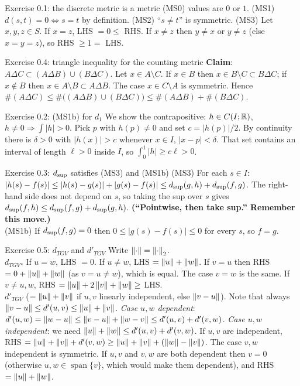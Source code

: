 \begin{example}{Exercise 0.1: the discrete metric is a metric}
(MS0) values are $0$ or $1$. (MS1) $d(s,t)=0\iff s=t$ by definition. (MS2) ``$s\ne t$'' is
symmetric. (MS3) Let $x,y,z\in S$. If $x=z$, LHS $=0\le$ RHS. If $x\ne z$ then $y\ne x$ or
$y\ne z$ (else $x=y=z$), so RHS $\ge1=$ LHS.
\end{example}

\begin{example}{Exercise 0.4: triangle inequality for the counting metric}
\textbf{Claim}: $A\Delta C\subset(A\Delta B)\cup(B\Delta C)$. Let $x\in A\setminus C$. If
$x\in B$ then $x\in B\setminus C\subset B\Delta C$; if $x\notin B$ then $x\in A\setminus B\subset
A\Delta B$. The case $x\in C\setminus A$ is symmetric. Hence
$\#(A\Delta C)\le\#\big((A\Delta B)\cup(B\Delta C)\big)\le\#(A\Delta B)+\#(B\Delta C)$.
\end{example}

\begin{example}{Exercise 0.2: (MS1b) for $d_1$}
We show the contrapositive: $h\in C(I;\mathbb R)$, $h\ne0\Rightarrow\int|h|>0$. Pick $p$ with
$h(p)\ne0$ and set $c=|h(p)|/2$. By continuity there is $\delta>0$ with $|h(x)|>c$ whenever
$x\in I$, $|x-p|<\delta$. That set contains an interval of length $\ell>0$ inside $I$, so
$\int_0^1|h|\ge c\ell>0$.
\end{example}

\begin{example}{Exercise 0.3: $d_{\sup}$ satisfies (MS3) and (MS1b)}
(MS3) For each $s\in I$: $|h(s)-f(s)|\le|h(s)-g(s)|+|g(s)-f(s)|\le d_{\sup}(g,h)+d_{\sup}(f,g)$.
The right-hand side does not depend on $s$, so taking the sup over $s$ gives
$d_{\sup}(f,h)\le d_{\sup}(f,g)+d_{\sup}(g,h)$. \textbf{(``Pointwise, then take sup.'' Remember this
move.)}\\
(MS1b) If $d_{\sup}(f,g)=0$ then $0\le|g(s)-f(s)|\le0$ for every $s$, so $f=g$.
\end{example}

\begin{example}{Exercise 0.5: $d_{TGV}$ and $d'_{TGV}$}
Write $\left\lVert\cdot\right\rVert=\left\lVert\cdot\right\rVert_2$.\\
\textbf{$d_{TGV}$.} If $u=w$, LHS $=0$. If $u\ne w$, LHS $=\left\lVert u\right\rVert+\left\lVert w\right\rVert$. If $v=u$ then RHS
$=0+\left\lVert u\right\rVert+\left\lVert w\right\rVert$ (as $v=u\ne w$), which is equal. The case $v=w$ is the same. If $v\ne u,w$,
RHS $=\left\lVert u\right\rVert+2\left\lVert v\right\rVert+\left\lVert w\right\rVert\ge$ LHS.\\
\textbf{$d'_{TGV}$} ($=\left\lVert u\right\rVert+\left\lVert v\right\rVert$ if $u,v$ linearly independent, else $\left\lVert v-u\right\rVert$).
Note that always $\left\lVert v-u\right\rVert\le d'(u,v)\le\left\lVert u\right\rVert+\left\lVert v\right\rVert$.
\emph{Case $u,w$ dependent}: $d'(u,w)=\left\lVert w-u\right\rVert\le\left\lVert v-u\right\rVert+\left\lVert w-v\right\rVert\le d'(u,v)+d'(v,w)$.
\emph{Case $u,w$ independent}: we need $\left\lVert u\right\rVert+\left\lVert w\right\rVert\le d'(u,v)+d'(v,w)$.
If $u,v$ are independent, RHS $=\left\lVert u\right\rVert+\left\lVert v\right\rVert+d'(v,w)\ge\left\lVert u\right\rVert+\left\lVert v\right\rVert+(\left\lVert w\right\rVert-\left\lVert v\right\rVert)$.
The case $v,w$ independent is symmetric. If $u,v$ and $v,w$ are both dependent then $v=0$
(otherwise $u,w\in\operatorname{span}\{v\}$, which would make them dependent), and
RHS $=\left\lVert u\right\rVert+\left\lVert w\right\rVert$.
\end{example}

